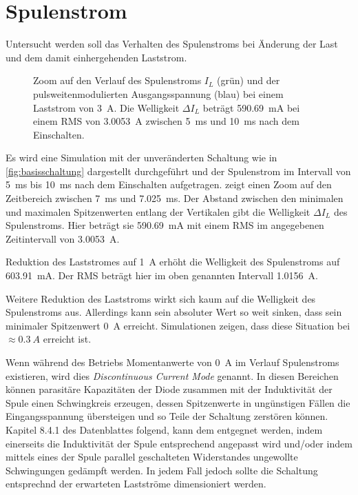 	\section{Spulenstrom}
		Untersucht werden soll das Verhalten des Spulenstroms bei Änderung der Last und dem damit einhergehenden Laststrom.
		\begin{figure}[h]
			\centering
			
			\caption[Zoom auf den Verlauf des Spulenstroms \(I_L\)]{Zoom auf den Verlauf des Spulenstroms \(I_L\) (grün) und der pulsweitenmodulierten Ausgangsspannung (blau) bei einem Laststrom von \SI{3}{A}. Die Welligkeit \(\Delta I_L\) beträgt
			\SI{590,69}{mA} bei einem RMS von \SI{3,0053}{A} zwischen \SI{5}{ms} und \SI{10}{ms} nach dem Einschalten.}
			\label{fig:spulenstrom}
		\end{figure}%
		Es wird eine Simulation mit der unveränderten Schaltung wie in \cref{fig:basisschaltung} dargestellt durchgeführt und der Spulenstrom
		im Intervall von \SI{5}{ms} bis \SI{10}{ms} nach dem Einschalten aufgetragen.
		 zeigt einen Zoom auf den
		Zeitbereich zwischen \SI{7}{ms} und \SI{7,025}{ms}. Der Abstand zwischen den minimalen und maximalen Spitzenwerten entlang der Vertikalen 
		gibt die Welligkeit \(\Delta I_L\) des Spulenstroms. Hier beträgt sie \SI{590,69}{mA} mit einem RMS im angegebenen Zeitintervall
		von \SI{3,0053}{A}.\par
		Reduktion des Laststromes auf \SI{1}{A} erhöht die Welligkeit des Spulenstroms auf \SI{603,91}{mA}. Der RMS beträgt hier im oben genannten Intervall
		\SI{1,0156}{A}.\par\medskip
		Weitere Reduktion des Laststroms wirkt sich kaum auf die Welligkeit des Spulenstroms aus. Allerdings kann sein absoluter Wert
		so weit sinken, dass sein minimaler Spitzenwert \SI{0}{A} erreicht. Simulationen zeigen, dass diese Situation bei \(\approx \SI{0.3}{A}\)
		erreicht ist.\par
		Wenn während des Betriebs Momentanwerte von \SI{0}{A} im Verlauf Spulenstroms existieren, wird dies \textit{Discontinuous Current Mode} genannt.
		In diesen Bereichen können parasitäre Kapazitäten der Diode zusammen mit der Induktivität der Spule einen Schwingkreis erzeugen, dessen
		Spitzenwerte in ungünstigen Fällen die Eingangsspannung übersteigen und so Teile der Schaltung zerstören können. Kapitel 8.4.1 des
		Datenblattes folgend, kann dem entgegnet werden, indem einerseits die Induktivität der Spule entsprechend angepasst wird und/oder
		indem mittels eines der Spule parallel geschalteten Widerstandes ungewollte Schwingungen gedämpft werden. In jedem Fall jedoch
		sollte die Schaltung entsprechnd der erwarteten Lastströme dimensioniert werden.
